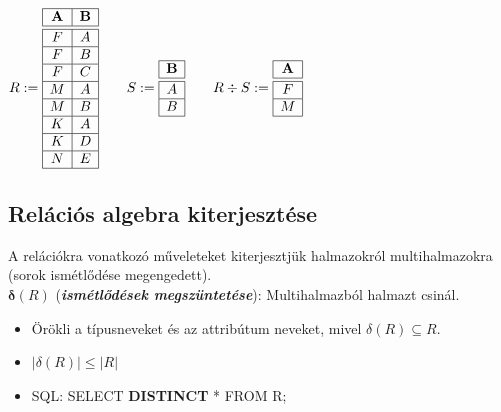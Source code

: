 \documentclass[tikz,12pt,margin=0px]{article}
\begin{document}
    \begin{center}
        $R := \begin{array}{|c|c|}
            \hline
            \textbf{A} & \textbf{B} \\ \hline \hline
            F & A \\ \hline
            F & B \\ \hline
            F & C \\ \hline
            M & A \\ \hline
            M & B \\ \hline
            K & A \\ \hline
            K & D \\ \hline
            N & E \\ \hline
        \end{array} \qquad S := \begin{array}{|c|}
            \hline
            \textbf{B} \\ \hline \hline
            A \\ \hline
            B \\ \hline
        \end{array} \qquad R \div S := \begin{array}{|c|}
            \hline
            \textbf{A} \\ \hline \hline
            F \\ \hline
            M \\ \hline
        \end{array}$
    \end{center}

	\subsection*{Relációs algebra kiterjesztése\\}
	
    \noindent A relációkra vonatkozó műveleteket kiterjesztjük halmazokról multihalmazokra (sorok ismétlődése megengedett).\\
\newpage
	\noindent $\boldsymbol{\delta}(R)$ (\textbf{\emph{ismétlődések megszüntetése}}): Multihalmazból halmazt csinál.
        \begin{itemize}
            \item Örökli a típusneveket és az attribútum neveket, mivel $\delta(R) \subseteq R$.
            \item $\Big|\delta(R)\Big| \leq \Big|R\Big|$
            \item SQL: SELECT \textbf{DISTINCT} * FROM R;
        \end{itemize}
\end{document}
